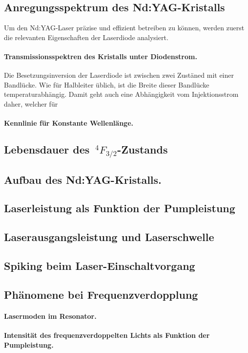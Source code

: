 \documentclass[../main.tex]{subfiles}
\begin{document}
    \subsection{Anregungsspektrum des Nd:YAG-Kristalls}
        Um den Nd:YAG-Laser präzise und effizient betreiben zu können, werden zuerst die relevanten Eigenschaften der Laserdiode analysiert.

        \paragraph{Transmissionsspektren des Kristalls unter Diodenstrom.} Die Besetzungsinversion der Laserdiode ist zwischen zwei Zustäned mit einer Bandlücke. Wie für Halbleiter üblich, ist die Breite dieser Bandlücke temperaturabhängig. Damit geht auch eine Abhängigkeit vom Injektionsstrom daher, welcher für

        \paragraph{Kennlinie für Konstante Wellenlänge.}

    \subsection{Lebensdauer des $\,^4F_{3/2}$-Zustands}

    \subsection{Aufbau des Nd:YAG-Kristalls.}

    \subsection{Laserleistung als Funktion der Pumpleistung}

    \subsection{Laserausgangsleistung und Laserschwelle}

    \subsection{Spiking beim Laser-Einschaltvorgang}

    \subsection{Phänomene bei Frequenzverdopplung}
        \paragraph{Lasermoden im Resonator.}
        
        \paragraph{Intensität des frequenzverdoppelten Lichts als Funktion der Pumpleistung.}
\end{document}
